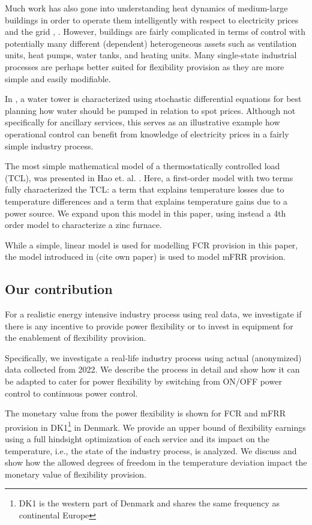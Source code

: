 \documentclass[lettersize,journal]{IEEEtran}
\begin{document}
Much work has also gone into understanding heat dynamics of medium-large buildings \cite{thilker2021non} in order to operate them intelligently with respect to electricity prices and the grid \cite{contreras2018tractable}, \cite{finck2018quantifying}. However, buildings are fairly complicated in terms of control with potentially many different (dependent) heterogeneous assets such as ventilation units, heat pumps, water tanks, and heating units. Many single-state industrial processes are perhaps better suited for flexibility provision as they are more simple and easily modifiable.

In \cite{junker2020stochastic}, a water tower is characterized using stochastic differential equations for best planning how water should be pumped in relation to spot prices. Although not specifically for ancillary services, this serves as an illustrative example how operational control can benefit from knowledge of electricity prices in a fairly simple industry process.

The most simple mathematical model of a thermostatically controlled load (TCL), was presented in Hao et. al. \cite{hao2014aggregate}. Here, a first-order model with two terms fully characterized the TCL: a term that explains temperature losses due to temperature differences and a term that explains temperature gains due to a power source. We expand upon this model in this paper, using instead a 4th order model to characterize a zinc furnace.

While a simple, linear model is used for modelling FCR provision in this paper, the model introduced in (cite own paper) is used to model mFRR provision.



\subsection{Our contribution}

For a realistic energy intensive industry process using real data, we investigate if there is any incentive to provide power flexibility or to invest in equipment for the enablement of flexibility provision.

Specifically, we investigate a real-life industry process using actual (anonymized) data collected from 2022. We describe the process in detail and show how it can be adapted to cater for power flexibility by switching from ON/OFF power control to continuous power control.

The monetary value from the power flexibility is shown for FCR and mFRR provision in DK1\footnote{DK1 is the western part of Denmark and shares the same frequency as continental Europe} in Denmark. We provide an upper bound of flexibility earnings using a full hindsight optimization of each service and its impact on the temperature, i.e., the state of the industry process, is analyzed. We discuss and show how the allowed degrees of freedom in the temperature deviation impact the monetary value of flexibility provision.
\end{document}
